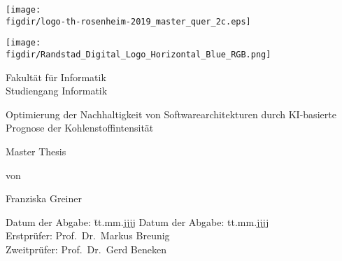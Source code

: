 \begin{titlepage}

\sffamily

\begin{flushright}

\vspace*{-2cm}

\texttt{[image: \\figdir/logo-th-rosenheim-2019\_master\_quer\_2c.eps]}

\end{flushright}
\begin{flushleft}

\vspace*{-2cm}

\texttt{[image: \\figdir/Randstad\_Digital\_Logo\_Horizontal\_Blue\_RGB.png]}
\end{flushleft}

\vfill

\centering
\LARGE
Fakultät für Informatik  \vspace{0.5cm}\\
\Large
Studiengang Informatik

\vspace{2cm}

\LARGE

Optimierung der Nachhaltigkeit von Softwarearchitekturen durch KI-basierte Prognose der Kohlenstoffintensität

\vspace{2cm}

\Large
Master Thesis

\vspace{1.5cm}


\Large
von

\vspace{0.5cm}


\LARGE
Franziska Greiner \vspace{1cm}

\vspace{1cm}

\flushleft
 \Large
\vspace*{\fill}

\begin{tabbing}
Datum der Abgabe: \= tt.mm.jjjj \kill
Datum der Abgabe: \> tt.mm.jjjj \\
Erstprüfer: \> Prof.\ Dr.\ Markus Breunig\\
Zweitprüfer: \> Prof.\ Dr.\ Gerd Beneken
\end{tabbing}

\vspace{1cm}
\centering
\small


\end{titlepage}

